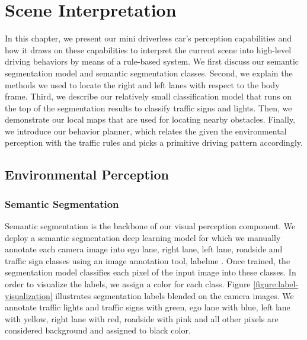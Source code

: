 \chapter{Scene Interpretation}
\label{chp:b4}

In this chapter, we present our mini driverless car's perception capabilities
and how it draws on these capabilities to interpret the current scene into
high-level driving behaviors by means of a rule-based system. We first discuss
our semantic segmentation model and semantic segmentation classes. Second, we
explain the methods we used to locate the right and left lanes with respect to
the body frame. Third, we describe our relatively small classification model
that runs on the top of the segmentation results to classify traffic signs and
lights. Then, we demonstrate our local maps that are used for locating nearby
obstacles. Finally, we introduce our behavior planner, which relates the given
the environmental perception with the traffic rules and picks a primitive
driving pattern accordingly.

\section{Environmental Perception}

\subsection{Semantic Segmentation}

Semantic segmentation is the backbone of our visual perception component. We
deploy a semantic segmentation deep learning model for which we manually
annotate each camera image into ego lane, right lane, left lane, roadside and
traffic sign classes using an image annotation tool, labelme \cite{cite4}. Once
trained, the segmentation model classifies each pixel of the input image into
these classes. In order to visualize the labels, we assign a color for each
class.  Figure \ref{figure:label-visualization} illustrates segmentation labels
blended on the camera images. We annotate traffic lights and traffic signs with
green, ego lane with blue, left lane with yellow, right lane with red, roadside
with pink and all other pixels are considered background and assigned to black
color.

